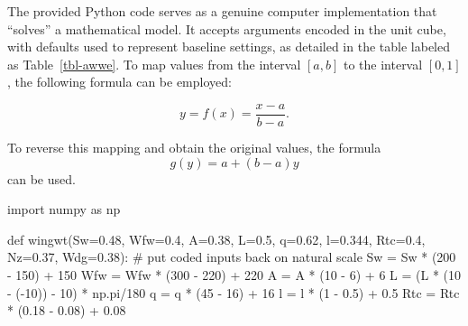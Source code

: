 \documentclass[
  letterpaper,
  DIV=11,
  numbers=noendperiod]{scrreprt}
\newenvironment{Shaded}{\begin{snugshade}}{\end{snugshade}}
\newcommand{\CommentTok}[1]{\textcolor[rgb]{0.37,0.37,0.37}{#1}}
\newcommand{\DecValTok}[1]{\textcolor[rgb]{0.68,0.00,0.00}{#1}}
\newcommand{\FloatTok}[1]{\textcolor[rgb]{0.68,0.00,0.00}{#1}}
\newcommand{\ImportTok}[1]{\textcolor[rgb]{0.00,0.46,0.62}{#1}}
\newcommand{\KeywordTok}[1]{\textcolor[rgb]{0.00,0.23,0.31}{#1}}
\newcommand{\NormalTok}[1]{\textcolor[rgb]{0.00,0.23,0.31}{#1}}
\newcommand{\OperatorTok}[1]{\textcolor[rgb]{0.37,0.37,0.37}{#1}}
\begin{document}
The provided Python code serves as a genuine computer implementation
that ``solves'' a mathematical model. It accepts arguments encoded in
the unit cube, with defaults used to represent baseline settings, as
detailed in the table labeled as Table~\ref{tbl-awwe}. To map values
from the interval \([a, b]\) to the interval \([0, 1]\), the following
formula can be employed:

\[y = f(x) = \frac{x - a}{b - a}.\]

To reverse this mapping and obtain the original values, the formula
\[g(y) = a + (b - a) y\] can be used.

\begin{Shaded}
\begin{Highlighting}[]
\ImportTok{import}\NormalTok{ numpy }\ImportTok{as}\NormalTok{ np}

\KeywordTok{def}\NormalTok{ wingwt(Sw}\OperatorTok{=}\FloatTok{0.48}\NormalTok{, Wfw}\OperatorTok{=}\FloatTok{0.4}\NormalTok{, A}\OperatorTok{=}\FloatTok{0.38}\NormalTok{, L}\OperatorTok{=}\FloatTok{0.5}\NormalTok{, q}\OperatorTok{=}\FloatTok{0.62}\NormalTok{, l}\OperatorTok{=}\FloatTok{0.344}\NormalTok{,  Rtc}\OperatorTok{=}\FloatTok{0.4}\NormalTok{, Nz}\OperatorTok{=}\FloatTok{0.37}\NormalTok{, Wdg}\OperatorTok{=}\FloatTok{0.38}\NormalTok{):}
    \CommentTok{\# put coded inputs back on natural scale}
\NormalTok{    Sw }\OperatorTok{=}\NormalTok{ Sw }\OperatorTok{*}\NormalTok{ (}\DecValTok{200} \OperatorTok{{-}} \DecValTok{150}\NormalTok{) }\OperatorTok{+} \DecValTok{150} 
\NormalTok{    Wfw }\OperatorTok{=}\NormalTok{ Wfw }\OperatorTok{*}\NormalTok{ (}\DecValTok{300} \OperatorTok{{-}} \DecValTok{220}\NormalTok{) }\OperatorTok{+} \DecValTok{220} 
\NormalTok{    A }\OperatorTok{=}\NormalTok{ A }\OperatorTok{*}\NormalTok{ (}\DecValTok{10} \OperatorTok{{-}} \DecValTok{6}\NormalTok{) }\OperatorTok{+} \DecValTok{6} 
\NormalTok{    L }\OperatorTok{=}\NormalTok{ (L }\OperatorTok{*}\NormalTok{ (}\DecValTok{10} \OperatorTok{{-}}\NormalTok{ (}\OperatorTok{{-}}\DecValTok{10}\NormalTok{)) }\OperatorTok{{-}} \DecValTok{10}\NormalTok{) }\OperatorTok{*}\NormalTok{ np.pi}\OperatorTok{/}\DecValTok{180}
\NormalTok{    q }\OperatorTok{=}\NormalTok{ q }\OperatorTok{*}\NormalTok{ (}\DecValTok{45} \OperatorTok{{-}} \DecValTok{16}\NormalTok{) }\OperatorTok{+} \DecValTok{16} 
\NormalTok{    l }\OperatorTok{=}\NormalTok{ l }\OperatorTok{*}\NormalTok{ (}\DecValTok{1} \OperatorTok{{-}} \FloatTok{0.5}\NormalTok{) }\OperatorTok{+} \FloatTok{0.5}  
\NormalTok{    Rtc }\OperatorTok{=}\NormalTok{ Rtc }\OperatorTok{*}\NormalTok{ (}\FloatTok{0.18} \OperatorTok{{-}} \FloatTok{0.08}\NormalTok{) }\OperatorTok{+} \FloatTok{0.08}

\end{Highlighting}
\end{Shaded}
\end{document}
